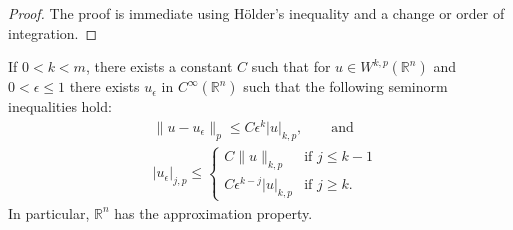 \begin{proof}
  The proof is immediate using H\"older's inequality and a change or
  order of integration.
\end{proof}


\begin{theorem}
  If $0<k<m$, there exists a constant $C$ such that for $u\in W^{k,p}(\mathbb{R}^n)$
  and $0<\epsilon\leq 1$ there exists $u_{\epsilon}$ in $C^{\infty}(\mathbb{R}^n)$
  such that the following seminorm inequalities hold:
  \begin{align*}
    & \|u-u_{\epsilon}\|_p \leq C\epsilon^k |u|_{k,p}, \qquad\text{and} \\
    & |u_{\epsilon}|_{j,p} \leq
      \begin{cases}
        C \|u\|_{k,p} & \text{if } j\leq k-1 \\
        C \epsilon^{k-j} |u|_{k,p} & \text{if } j\geq k.
      \end{cases}
  \end{align*}
  In particular, $\mathbb{R}^n$ has the approximation property.
\end{theorem}

